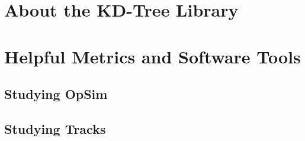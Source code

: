 \appendix
\section{About the KD-Tree Library}

\section{Helpful Metrics and Software Tools}
\subsection{Studying OpSim}
\subsection{Studying Tracks}

